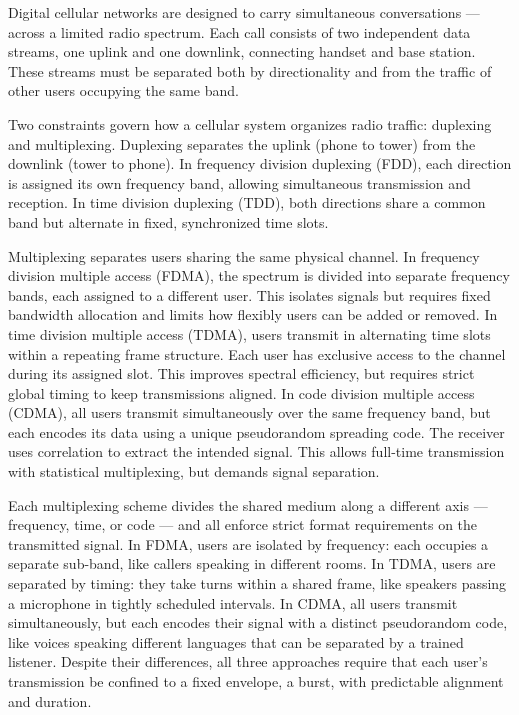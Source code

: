Digital cellular networks are designed to carry simultaneous conversations — across a limited radio spectrum. Each call consists of two independent data streams, one uplink and one downlink, connecting handset and base station. These streams must be separated both by directionality and from the traffic of other users occupying the same band.

Two constraints govern how a cellular system organizes radio traffic: duplexing and multiplexing. Duplexing separates the uplink (phone to tower) from the downlink (tower to phone). In frequency division duplexing (FDD), each direction is assigned its own frequency band, allowing simultaneous transmission and reception. In time division duplexing (TDD), both directions share a common band but alternate in fixed, synchronized time slots.

Multiplexing separates users sharing the same physical channel. In frequency division multiple access (FDMA), the spectrum is divided into separate frequency bands, each assigned to a different user. This isolates signals but requires fixed bandwidth allocation and limits how flexibly users can be added or removed. In time division multiple access (TDMA), users transmit in alternating time slots within a repeating frame structure. Each user has exclusive access to the channel during its assigned slot. This improves spectral efficiency, but requires strict global timing to keep transmissions aligned. In code division multiple access (CDMA), all users transmit simultaneously over the same frequency band, but each encodes its data using a unique pseudorandom spreading code. The receiver uses correlation to extract the intended signal. This allows full-time transmission with statistical multiplexing, but demands signal separation.

Each multiplexing scheme divides the shared medium along a different axis — frequency, time, or code — and all enforce strict format requirements on the transmitted signal. In FDMA, users are isolated by frequency: each occupies a separate sub-band, like callers speaking in different rooms. In TDMA, users are separated by timing: they take turns within a shared frame, like speakers passing a microphone in tightly scheduled intervals. In CDMA, all users transmit simultaneously, but each encodes their signal with a distinct pseudorandom code, like voices speaking different languages that can be separated by a trained listener. Despite their differences, all three approaches require that each user’s transmission be confined to a fixed envelope, a burst, with predictable alignment and duration.

